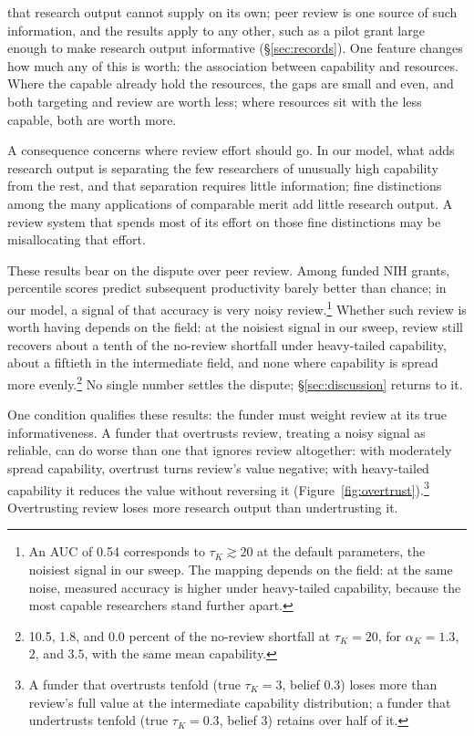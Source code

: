 \documentclass[article, 11pt, reqno]{amsart}
\theoremstyle{named}
\begin{document}
that research output cannot supply on its own; peer review is one source of such information, and the results apply to any other, such as a pilot grant large enough to make research output informative (\S\ref{sec:records}). One feature changes how much any of this is worth: the association between capability and resources. Where the capable already hold the resources, the gaps are small and even, and both targeting and review are worth less; where resources sit with the less capable, both are worth more.



A consequence concerns where review effort should go. In our model, what adds research output is separating the few researchers of unusually high capability from the rest, and that separation requires little information; fine distinctions among the many applications of comparable merit add little research output. A review system that spends most of its effort on those fine distinctions may be misallocating that effort.

These results bear on the dispute over peer review. Among funded NIH grants, percentile scores predict subsequent productivity barely better than chance; in our model, a signal of that accuracy is very noisy review.\footnote{An AUC of 0.54 \citep{Fang2016} corresponds to $\tau_K \gtrsim 20$ at the default parameters, the noisiest signal in our sweep. The mapping depends on the field: at the same noise, measured accuracy is higher under heavy-tailed capability, because the most capable researchers stand further apart.} Whether such review is worth having depends on the field: at the noisiest signal in our sweep, review still recovers about a tenth of the no-review shortfall under heavy-tailed capability, about a fiftieth in the intermediate field, and none where capability is spread more evenly.\footnote{10.5, 1.8, and 0.0 percent of the no-review shortfall at $\tau_K = 20$, for $\alpha_K = 1.3$, $2$, and $3.5$, with the same mean capability.} No single number settles the dispute; \S\ref{sec:discussion} returns to it.

One condition qualifies these results: the funder must weight review at its true informativeness. A funder that overtrusts review, treating a noisy signal as reliable, can do worse than one that ignores review altogether: with moderately spread capability, overtrust turns review's value negative; with heavy-tailed capability it reduces the value without reversing it (Figure~\ref{fig:overtrust}).\footnote{A funder that overtrusts tenfold (true $\tau_K = 3$, belief $0.3$) loses more than review's full value at the intermediate capability distribution; a funder that undertrusts tenfold (true $\tau_K = 0.3$, belief $3$) retains over half of it.} Overtrusting review loses more research output than undertrusting it.
\end{document}
